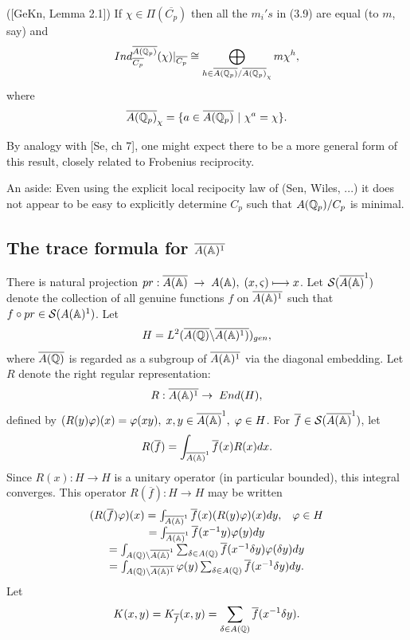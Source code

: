 \begin{lemma} ([GeKn, Lemma 2.1])
If $\chi \in \Pi (\overline{C_p})$ then all the $m_i's$ in (3.9) are
equal (to $m$, say) and
\[
Ind_{\overline{C_p}}^{\overline{A({\Bbb{Q}}_p)}}(\chi )|_{\overline{C_p}}
\cong \bigoplus_{h\in \overline{A({\Bbb{Q}}_p)}
/\overline{A({\Bbb{Q}}_p)}_{\chi}}
m\chi ^h,
\]
where
\[
\overline{A({\Bbb{Q}}_p)}_{\chi}
=\{a\in\overline{A({\Bbb{Q}}_p)} \ |\ \chi^a=\chi\}.
\]
\end{lemma}

\begin{remark} By analogy with [Se, ch 7], one might expect there to
be a more general form of this result, closely related to
Frobenius reciprocity.
\end{remark}
\begin{remark}
An aside: Even using the explicit local recipocity law of
(Sen, Wiles, ...) it does not appear to be
easy to explicitly determine $C_p$
such that $A({\Bbb{Q}}_p)/C_p$ is minimal.
\end{remark}


\subsection{The trace formula for \emph{$\overline{A({\Bbb{A}})^1}$}}

There is natural projection
$pr:\overline{A({\Bbb{A}})}\;\rightarrow \;A({\Bbb{A}}),
\;(x,\varsigma )\longmapsto x$. Let
${\cal{S}}(\overline{A({\Bbb{A}})}^1)$
denote the collection of all genuine functions $f$ on
$\overline{A({\Bbb{A}})^1}$ such
that $f\circ pr\in {\cal{S}}(A({\Bbb{A}})^1)$. Let 
\[
H=
L^2(\overline{A({\Bbb{Q}})}\backslash \overline{A({\Bbb{A}})^1)})_{gen},
\]
where \emph{$\overline{A({\Bbb{Q}})}$} is regarded as a subgroup
of $\overline{A({\Bbb{A}})^1}$ via the
diagonal embedding. Let $R$ denote
the right regular representation: 
\[
R:\overline{A({\Bbb{A}})^1}\rightarrow \;End(H),
\]
defined by $(R(y)\varphi )(x)
=\varphi (xy),\;x,y\in \overline{A({\Bbb{A}})}^1,
\;\varphi \in H$.
For $\overline{f}\in {\cal{S}}(\overline{A({\Bbb{A}})}^1)$, let 
\[
R(\overline{f})=\int_{\overline{A({\Bbb{A}})}^1}\overline{f}(x)R(x)dx.
\]
Since $R(x):H\rightarrow H$ is a unitary operator (in particular bounded),
this integral converges. This
operator $R(\overline{f}):H\rightarrow H$ may be written 
\begin{equation}
\begin{array}{c}
(R(\overline{f})\varphi )(x)
=\int_{\overline{A({\Bbb{A}})}^1}\overline{f}(x)(R(y)\varphi )(x)dy,
\;\;\;\varphi \in H \\ 
=\int_{\overline{A({\Bbb{A}})}^1}\overline{f}(x^{-1}y)\varphi (y)dy \\ 
=\int_{A({\Bbb{Q}})\backslash \overline{A({\Bbb{A}})}^1}
\sum_{\delta \in A({\Bbb{Q}})}
\overline{f}(x^{-1}\delta y)\varphi (\delta y)dy \\ 
=\int_{A({\Bbb{Q}})\backslash \overline{A({\Bbb{A}})^1}}
\varphi (y)
\sum_{\delta \in A({\Bbb{Q}})}\overline{f}(x^{-1}\delta y)dy.
\end{array}
\end{equation}
Let 
\[
K(x,y)=K_{\overline{f}}(x,y)
=\sum_{\delta \in A({\Bbb{Q}})}
\overline{f}(x^{-1}\delta y).
\]

